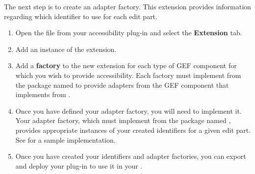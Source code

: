The next step is to create an adapter factory. This extension provides information regarding which identifier to use for each edit part.
\begin{enumerate}
\item  Open the  file from your accessibility plug-in and
select the \textbf{Extension} tab. %


\item Add an instance of the 
extension.
\item Add a \textbf{factory} to the new extension for each type of GEF component
for which you wish to provide accessibility. Each factory must implement
 from the package named
 to provide adapters from
the GEF component that implements  from
. %


\item Once you have defined your adapter factory, you will need to implement it.
Your adapter factory, which must implement  from the
package named , provides appropriate
instances of your created identifiers for a given edit part. See
 for a sample implementation.


\item Once you have created your identifiers and adapter factories, you can
export and deploy your plug-in to use it in your \gdaut{}.



\end{enumerate}

